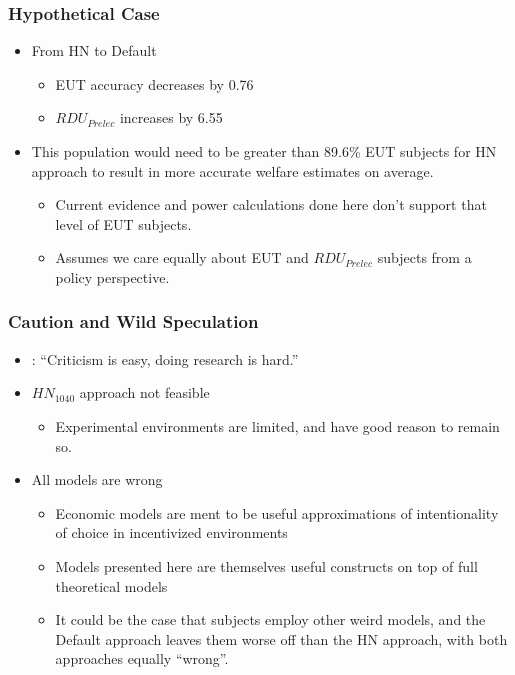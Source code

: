 \documentclass{beamer}
\begin{document}
\begin{frame}
\frametitle{Hypothetical Case}
\begin{itemize}
	\item From  HN to Default
		\begin{itemize}
			\item EUT accuracy decreases by 0.76
			\item $\mathit{RDU_{Prelec}}$ increases by 6.55
		\end{itemize}
	\item This population would need to be greater than 89.6\% EUT subjects for HN approach to result in more accurate welfare estimates on average.
		\begin{itemize}
			\item Current evidence and power calculations done here don't support that level of EUT subjects.
			\item Assumes we care equally about EUT and $\mathit{RDU_{Prelec}}$ subjects from a policy perspective.
		\end{itemize}
\end{itemize}
\end{frame}

\begin{frame}
\frametitle{Caution and Wild Speculation}
\begin{itemize}
	\item \textcite{Gelman2013}: \enquote{Criticism is easy, doing research is hard.}
	\item ${HN}_{1040}$ approach not feasible
		\begin{itemize}
			\item Experimental environments are limited, and have good reason to remain so.
		\end{itemize}
	\item All models are wrong
		\begin{itemize}
			\item Economic models are ment to be useful approximations of intentionality of choice in incentivized environments
			\item Models presented here are themselves useful constructs on top of full theoretical models
			\item It could be the case that subjects employ other weird models, and the Default approach leaves them worse off than the HN approach, with both approaches equally \enquote{wrong}.
		\end{itemize}
\end{itemize}
\end{frame}
\end{document}

